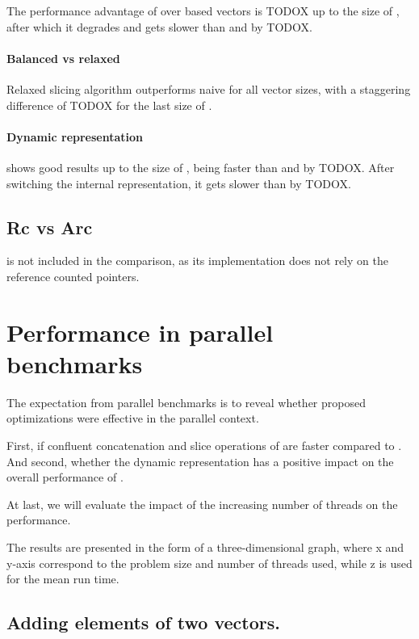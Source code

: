 The performance advantage of \stdvec{} over \rrbtree based vectors is TODOX up to the size of , after which it degrades and gets slower than \imrsvec{} and \rrbvec{} by TODOX. 

\paragraph{Balanced vs relaxed}
Relaxed slicing algorithm outperforms naive \rbvec{} for all vector sizes, with a staggering difference of TODOX for the last size of . 

\paragraph{Dynamic representation}
\pvec{} shows good results up to the size of , being faster than \rrbvec{} and \imrsvec{} by TODOX. After switching the internal representation, it gets slower than \rrbvec{} by TODOX. 

\subsection{Rc vs Arc}
\label{sec:perf-rc-vs-arc}
\stdvec{} is not included in the comparison, as its implementation does not rely on the reference counted pointers. 

\section{Performance in parallel benchmarks}
\label{sec:perf-par}

The expectation from parallel benchmarks is to reveal whether proposed optimizations were effective in the parallel context. 

First, if confluent concatenation and slice operations of \rrbvec{} are faster compared to \rbvec{}. And second, whether the dynamic representation has a positive impact on the overall performance of \pvec{}. 

At last, we will evaluate the impact of the increasing number of threads on the performance. 

The results are presented in the form of a three-dimensional graph, where x and y-axis correspond to the problem size and number of threads used, while z is used for the mean run time. 

\subsection{Adding elements of two vectors.} 

